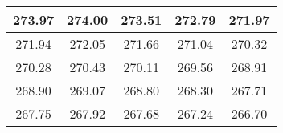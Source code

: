 \begin{large}\begin{tabular}{|c|c|c|c|c|}
\hline
273.97&274.00&273.51&272.79&271.97\\\hline
271.94&272.05&271.66&271.04&270.32\\\hline
270.28&270.43&270.11&269.56&268.91\\\hline
268.90&269.07&268.80&268.30&267.71\\\hline
267.75&267.92&267.68&267.24&266.70\\\hline
\end{tabular}
\end{large}